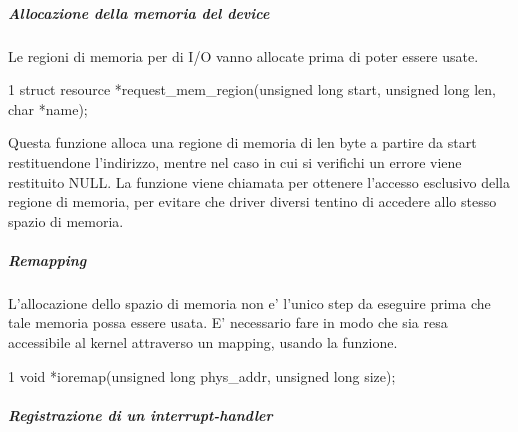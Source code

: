 \subparagraph*{Allocazione della memoria del device}

Le regioni di memoria per di I/\+O vanno allocate prima di poter essere usate. 
\begin{DoxyCode}
1 struct resource *request\_mem\_region(unsigned long start, unsigned long len, char *name);
\end{DoxyCode}
 Questa funzione alloca una regione di memoria di len byte a partire da start restituendone l'indirizzo, mentre nel caso in cui si verifichi un errore viene restituito N\+U\+L\+L. La funzione viene chiamata per ottenere l'accesso esclusivo della regione di memoria, per evitare che driver diversi tentino di accedere allo stesso spazio di memoria.

\subparagraph*{Remapping}

L'allocazione dello spazio di memoria non e' l'unico step da eseguire prima che tale memoria possa essere usata. E' necessario fare in modo che sia resa accessibile al kernel attraverso un mapping, usando la funzione. 
\begin{DoxyCode}
1 void *ioremap(unsigned long phys\_addr, unsigned long size);
\end{DoxyCode}


\subparagraph*{Registrazione di un interrupt-\/handler}

